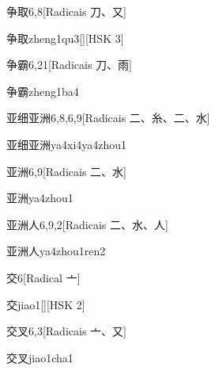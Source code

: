 \begin{entry}{争取}{6,8}[Radicais ⼑、⼜]
  \begin{phonetics}{争取}{zheng1qu3}[][HSK 3]
  \end{phonetics}
\end{entry}

\begin{entry}{争霸}{6,21}[Radicais ⼑、⾬]
  \begin{phonetics}{争霸}{zheng1ba4}
  \end{phonetics}
\end{entry}

\begin{entry}{亚细亚洲}{6,8,6,9}[Radicais ⼆、⽷、⼆、⽔]
  \begin{phonetics}{亚细亚洲}{ya4xi4ya4zhou1}
  \end{phonetics}
\end{entry}

\begin{entry}{亚洲}{6,9}[Radicais ⼆、⽔]
  \begin{phonetics}{亚洲}{ya4zhou1}
  \end{phonetics}
\end{entry}

\begin{entry}{亚洲人}{6,9,2}[Radicais ⼆、⽔、⼈]
  \begin{phonetics}{亚洲人}{ya4zhou1ren2}
  \end{phonetics}
\end{entry}

\begin{entry}{交}{6}[Radical ⼇]
  \begin{phonetics}{交}{jiao1}[][HSK 2]
  \end{phonetics}
\end{entry}

\begin{entry}{交叉}{6,3}[Radicais ⼇、⼜]
  \begin{phonetics}{交叉}{jiao1cha1}
  \end{phonetics}
\end{entry}

